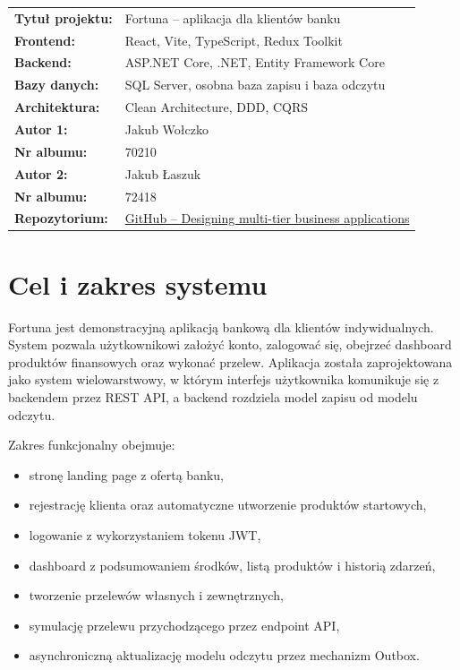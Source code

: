 \documentclass[12pt,a4paper]{article}
\begin{document}
\begin{center}
\begin{tabular}{ll}

\textbf{Tytuł projektu:} & Fortuna -- aplikacja dla klientów banku \\[6pt]
\textbf{Frontend:} & React, Vite, TypeScript, Redux Toolkit\\[6pt]
\textbf{Backend:} & ASP.NET Core, .NET, Entity Framework Core \\[6pt]
\textbf{Bazy danych:} & SQL Server, osobna baza zapisu i baza odczytu \\[6pt]
\textbf{Architektura:} & Clean Architecture, DDD, CQRS\\[6pt]

\textbf{Autor 1:} & Jakub Wołczko\\
\textbf{Nr albumu:} & 70210 \\[6pt]

\textbf{Autor 2:} & Jakub Łaszuk \\
\textbf{Nr albumu:} & 72418 \\[6pt]

\textbf{Repozytorium:} & \href{https://github.com/jwolczko/Designing-multi-tier-business-applications}{GitHub -- Designing multi-tier business applications}

\end{tabular}
\end{center}

\newpage
\tableofcontents
\newpage

\section{Cel i zakres systemu}

Fortuna jest demonstracyjną aplikacją bankową dla klientów indywidualnych. System pozwala użytkownikowi założyć konto, zalogować się, obejrzeć dashboard produktów finansowych oraz wykonać przelew. Aplikacja została zaprojektowana jako system wielowarstwowy, w którym interfejs użytkownika komunikuje się z backendem przez REST API, a backend rozdziela model zapisu od modelu odczytu.

Zakres funkcjonalny obejmuje:
\begin{itemize}[nosep]
    \item stronę landing page z ofertą banku,
    \item rejestrację klienta oraz automatyczne utworzenie produktów startowych,
    \item logowanie z wykorzystaniem tokenu JWT,
    \item dashboard z podsumowaniem środków, listą produktów i historią zdarzeń,
    \item tworzenie przelewów własnych i zewnętrznych,
    \item symulację przelewu przychodzącego przez endpoint API,
    \item asynchroniczną aktualizację modelu odczytu przez mechanizm Outbox.
\end{itemize}
\end{document}
